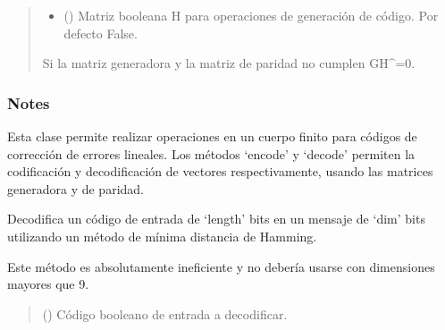\documentclass[letterpaper,10pt,english]{sphinxmanual}
\begin{document}
\begin{fulllineitems}
\begin{quote}
\begin{description}
\begin{itemize}
\item {} 
\sphinxAtStartPar
{} (\sphinxstyleliteralemphasis{\sphinxupquote{, }}) \textendash{} Matriz booleana H para operaciones de generación de código. Por defecto False.

\end{itemize}

\sphinxAtStartPar
{} \textendash{} Si la matriz generadora y la matriz de paridad no cumplen GH\textasciicircum{}=0.

\end{description}\end{quote}
\subsubsection*{Notes}

\sphinxAtStartPar
Esta clase permite realizar operaciones en un cuerpo finito para códigos de corrección de errores lineales.
Los métodos ‘encode’ y ‘decode’ permiten la codificación y decodificación de vectores respectivamente,
usando las matrices generadora y de paridad.

\begin{fulllineitems}
\label{\detokenize{myutils:myutils.bool.LinearSystECC.decode}}
\pysigstartsignatures
{}
\pysigstopsignatures
\sphinxAtStartPar
Decodifica un código de entrada de ‘length’ bits en un mensaje de ‘dim’ bits
utilizando un método de mínima distancia de Hamming.

\sphinxAtStartPar
Este método es absolutamente ineficiente y no debería usarse con dimensiones
mayores que 9.
\begin{quote}\begin{description}
\sphinxAtStartPar
{} () \textendash{} Código booleano de entrada a decodificar.


\end{description}
\end{quote}
\end{fulllineitems}
\end{fulllineitems}
\end{document}
